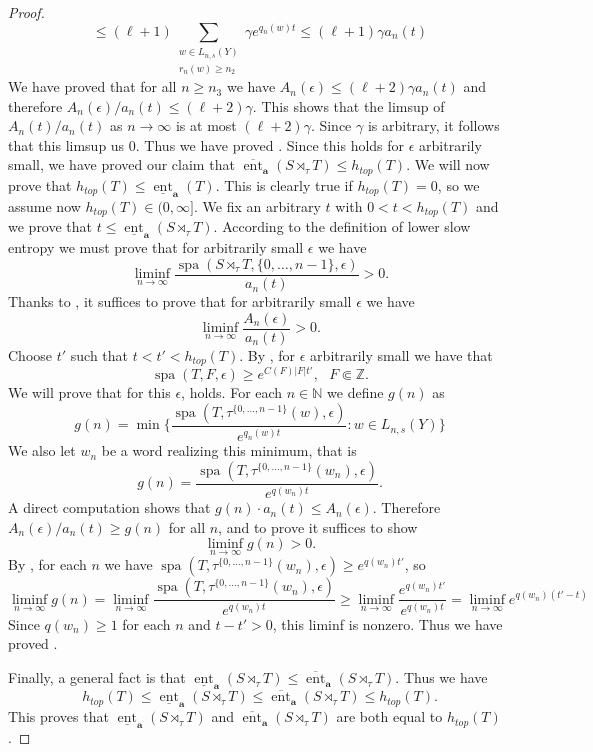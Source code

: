 \documentclass[a4paper,oneside]{amsart}
\renewcommand{\(}{\begin{dmath*}}
\renewcommand{\)}{\end{dmath*}}
\theoremstyle{definition}
\newcommand{\N}{\mathbb{N}}
\newcommand{\Z}{\mathbb{Z}}
\newcommand{\upperent}{\overline{\operatorname{ent}}}
\newcommand{\lowerent}{\underline{\operatorname{ent}}}
\newcommand{\spa}{\operatorname{spa}}
\begin{document}
\begin{proof}
    \(
    \leq (\ell+1) \sum_{\substack{w\in L_{n,s}(Y)\\ r_n(w)\geq  n_2}} \gamma e^{q_n(w)t}
    \leq (\ell+1)\gamma a_n(t)
    \)
    We have proved that for all $n\geq n_3$ we have  $A_n(\epsilon)\leq (\ell+2) \gamma a_n(t)$ and therefore $A_n(\epsilon)/a_n(t)\leq (\ell+2) \gamma$. This shows that the limsup of $A_n(t)/a_n(t)$ as $n\to\infty$ is at most $(\ell+2) \gamma$. Since $\gamma$ is arbitrary, it follows that this limsup us $0$. Thus we have proved . Since this holds for  $\epsilon$ arbitrarily small, we have proved our claim that $\upperent_{\textbf{a}}(S\rtimes_\tau T)\leq h_{top}(T)$. 
    We will now prove that $h_{top}(T)\leq \lowerent_{\textbf{a}}(T)$. This is clearly true if $h_{top}(T)=0$, so we assume now $h_{top}(T)\in (0,\infty]$. We fix an arbitrary $t$ with $0<t<h_{top}(T)$ and we prove that $t\leq \lowerent_{\textbf{a}}(S\rtimes_\tau T)$. According to the definition of lower slow entropy we must prove that for arbitrarily small $\epsilon$ we have
    \[\liminf_{n\to\infty} \frac{\spa(S\rtimes_\tau T,\{0,\dots,n-1\},\epsilon)}{a_n(t)}>0.\]
    Thanks to , it suffices to prove that for arbitrarily small $\epsilon$ we have \begin{equation}\label{liminf}\liminf_{n\to\infty} \frac{A_n(\epsilon)}{a_n(t)}>0.\end{equation}
    Choose $t'$ such that $t<t'<h_{top}(T)$. By , for $\epsilon$ arbitrarily small we have that
    \begin{equation}\label{lower-bound-spa}
    \spa(T,F,\epsilon)\geq e^{C(F)|F|t'}, \ \ \ F\Subset \Z.
    \end{equation}
    We will prove that for this $\epsilon$,  holds. For each $n\in\N$ we define $g(n)$ as 
    \[g(n)=\min \{\frac{\spa(T,\tau^{\{0,\dots,n-1\}}(w),\epsilon)}{e^{q_n(w)t}} : w\in L_{n,s}(Y)\}\]
    We also let $w_n$ be a word realizing this minimum, that is \[g(n)=\frac{\spa(T,\tau^{\{0,\dots,n-1\}}(w_n),\epsilon)}{e^{q(w_n)t}}.\]
    A direct computation shows that  $g(n)\cdot a_n(t)\leq A_n(\epsilon)$. Therefore $A_n(\epsilon)/a_n(t)\geq g(n)$ for all $n$, and to prove  it suffices to show
    \[\liminf_{n\to\infty} g(n)>0.\]
    By ,  for each $n$ we have $\spa(T,\tau^{\{0,\dots,n-1\}}(w_n),\epsilon)\geq e^{q(w_n)t'}$, so
\(\liminf_{n\to\infty} g(n)=\liminf_{n\to\infty} \frac{\spa(T,\tau^{\{0,\dots,n-1\}}(w_n),\epsilon)}{e^{q(w_n)t}}\geq \liminf_{n\to\infty} \frac{e^{q(w_n)t'}}{e^{q(w_n)t}}
=\liminf_{n\to\infty}e^{q(w_n)(t'-t)}
\)
Since $q(w_n)\geq 1$ for each $n$ and $t-t'>0$, this liminf is nonzero.  Thus we have proved . 


Finally, a general fact is that $\lowerent_{\textbf{a}}(S\rtimes_\tau T)\leq \upperent_{\textbf{a}}(S\rtimes_\tau T)$. Thus we have
\[h_{top}(T)\leq \lowerent_{\textbf{a}}(S\rtimes_\tau T)\leq \upperent_{\textbf{a}}(S\rtimes_\tau T)\leq h_{top}(T).\]
This proves that $\lowerent_{\textbf{a}}(S\rtimes_\tau T)$ and $\upperent_{\textbf{a}}(S\rtimes_\tau T)$ are both equal to $h_{top}(T)$.
\end{proof}
\end{document}
